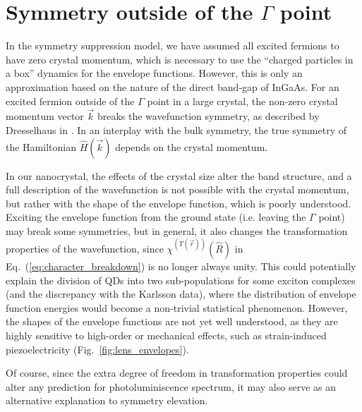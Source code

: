 \section{Symmetry outside of the $\Gamma$ point} \label{sec:symmetry_outside_gamma}
In the symmetry suppression model, we have assumed all excited fermions to have zero crystal momentum, which is necessary to use the ``charged particles in a box'' dynamics for the envelope functions. However, this is only an approximation based on the nature of the direct band-gap of InGaAs. For an excited fermion outside of the $\Gamma$ point in a large crystal, the non-zero crystal momentum vector $\vec{k}$ breaks the wavefunction symmetry, as described by Dresselhaus in \cite[Ch.~13]{dresselhaus}. In an interplay with the bulk symmetry, the true symmetry of the Hamiltonian $\hat{H}\left(\vec{k}\right)$ depends on the crystal momentum. 

In our nanocrystal, the effects of the crystal size alter the band structure, and a full description of the wavefunction is not possible with the crystal momentum, but rather with the shape of the envelope function, which is poorly understood. Exciting the envelope function from the ground state (i.e. leaving the $\Gamma$ point) may break some symmetries, but in general, it also changes the transformation properties of the wavefunction, since $\chi^{\left(\Upsilon\left(\vec{r}\right)\right)}\left(\hat{R}\right)$ in Eq.~(\ref{eq:character_breakdown}) is no longer always unity. This could potentially explain the division of QDs into two sub-populations for some exciton complexes (and the discrepancy with the Karlsson data), where the distribution of envelope function energies would become a non-trivial statistical phenomenon. However, the shapes of the envelope functions are not yet well understood, as they are highly sensitive to high-order or mechanical effects, such as strain-induced piezoelectricity (Fig.~\ref{fig:lens_envelopes}).

Of course, since the extra degree of freedom in transformation properties could alter any prediction for photoluminiscence spectrum, it may also serve as an alternative explanation to symmetry elevation.\\


